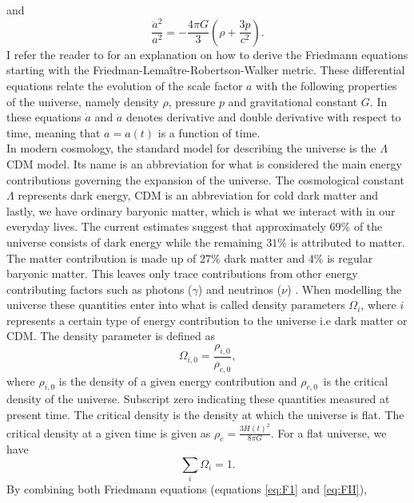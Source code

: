 and
\begin{equation}\label{eq:FII}
    \frac{\ddot{a}^2}{a^2} = -\frac{4\pi G}{3}(\rho + \frac{3p}{c^2}).
\end{equation}
I refer the reader to \cite[ch. 2]{Dodelson:1282338} for an explanation on how to derive the Friedmann equations starting with the Friedman-Lemaître-Robertson-Walker metric.
These differential equations relate the evolution of the scale factor $a$ with the
following properties of the universe, namely density $\rho$, pressure $p$ and gravitational
constant $G$. In these equations $\dot{a}$ and $\ddot{a}$ denotes
derivative and double derivative with respect to time, meaning that $a=a(t)$ is a
function of time. \\

In modern cosmology, the standard model for describing the universe is the $\Lambda$CDM model. Its name is an abbreviation for what 
is considered the main energy contributions governing the expansion of the universe. The cosmological constant $\Lambda$ represents dark energy, CDM is an abbreviation for cold dark matter
and lastly, we have ordinary baryonic matter, which is what we interact with in our
everyday lives. The current estimates suggest that approximately $69\%$ of the
universe consists of dark energy while the remaining $31\%$ is attributed to
matter. The matter contribution is made up of
$27\%$ dark matter and $4\%$ is regular baryonic matter. This leaves only trace contributions from other
energy contributing factors such as photons ($\gamma$) and neutrinos ($\nu$)
\cite{planckparameters}. When modelling the universe these quantities
enter into 
what is called density parameters $\Omega_i$, where $i$ represents a certain type of energy contribution to the universe i.e dark matter or CDM. The density parameter is defined as
\begin{equation}\label{eq:densityparameter}
    \Omega_{i,0} = \frac{\rho_{i,0}}{\rho_{c,0}},
\end{equation}
where $\rho_{i,0}$ is the density of a given energy contribution and $\rho_{c,0}$ is
the critical density of the universe. Subscript zero indicating these quantities
measured at present time. The critical density is the density at which the universe is flat. The critical density at a
given time is given as $\rho_c=\frac{3H(t)^2}{8\pi G}$. For a flat universe, we have
\begin{equation}
    \sum_i \Omega_i = 1.
\end{equation}
By combining both Friedmann equations (equations \ref{eq:F1} and \ref{eq:FII}),

